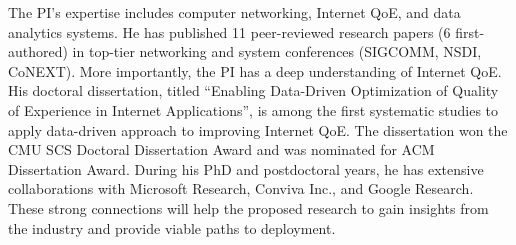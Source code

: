 

The PI's expertise includes computer networking, Internet QoE, and data analytics systems.
He has published 11 peer-reviewed research papers (6 first-authored) in top-tier networking and system conferences (\ie SIGCOMM, NSDI, CoNEXT).
More importantly, the PI has a deep understanding of Internet QoE. His doctoral dissertation, titled ``Enabling Data-Driven Optimization of Quality of Experience in Internet Applications'', is among the first systematic studies to apply data-driven approach to improving Internet  QoE. The dissertation won the CMU SCS Doctoral Dissertation Award and was nominated for ACM Dissertation Award.
During his PhD and postdoctoral years, he has extensive collaborations with Microsoft Research, Conviva Inc., and Google Research. These strong connections will help the proposed research to gain insights from the industry and provide viable paths to deployment.









